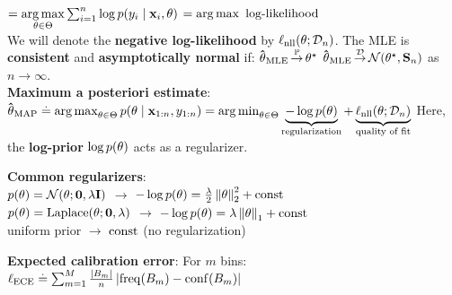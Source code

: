  $ = \underset{\mathbf{\theta} \in \Theta}{\operatorname*{arg\,max}} \sum_{i=1}^n \log p(y_i \mid \mathbf{x}_i, \mathbf{\theta}) $ $ = \operatorname*{arg\,max} \text{ log-likelihood}$ \\
We will denote the \textbf{negative log-likelihood} by $\ell_\mathrm{nll}(\mathbf{\theta}; \mathcal{D}_n)$.
The MLE is \textbf{consistent} and \textbf{asymptotically normal} if: $\mathbf{\hat{\theta}}_{\mathrm{MLE}} \operatorname*{\smash{\overset{\mathbb{P}}{\rightarrow}}} \mathbf{\theta}^\star$ $\vthetahat_\MLE \convd \N{\opt{\vtheta}}{\mS_n}$ as $n \to \infty$. \\
\textbf{Maximum a posteriori estimate}: \\
$\mathbf{\hat{\theta}}_{\mathrm{MAP}} \overset{.}{=} \operatorname*{arg\,max}_{\mathbf{\theta} \in \Theta} p(\mathbf{\theta} \mid \mathbf{x}_{1:n}, y_{1:n}) 
  = \operatorname*{arg\,min}_{\mathbf{\theta} \in \Theta} \underbrace{- \log p(\mathbf{\theta})}_{\text{regularization}} + \underbrace{\ell_\mathrm{nll}(\mathbf{\theta}; \mathcal{D}_n)}_{\text{quality of fit}}$
Here, the \textbf{log-prior} $\log p(\mathbf{\theta})$ acts as a regularizer.\\
\begin{framed}
\textbf{Common regularizers}: \\
 $p(\vtheta) = \N[\vtheta]{\vzero}{\lambda \mI}$ $\rightarrow$ $-\log p(\vtheta) = \frac{\lambda}{2} \norm{\vtheta}_2^2 + \const$ \\
 $p(\vtheta) = \Laplace[\vtheta]{\vzero}{\lambda}$ $\rightarrow$ $-\log p(\vtheta) = \lambda \norm{\vtheta}_1 + \const$ \\
 uniform prior $\rightarrow$ $\mathrm{const}$ (no regularization)
 \end{framed}
\begin{framed}
     \textbf{Expected calibration error}: For $m$ bins: $\ell_{\mathrm{ECE}} \overset{.}{=} \sum_{m=1}^M \frac{\left| B_m \right|}{n} \left| \mathrm{freq}(B_m) - \mathrm{conf}(B_m) \right|$
 \end{framed}

